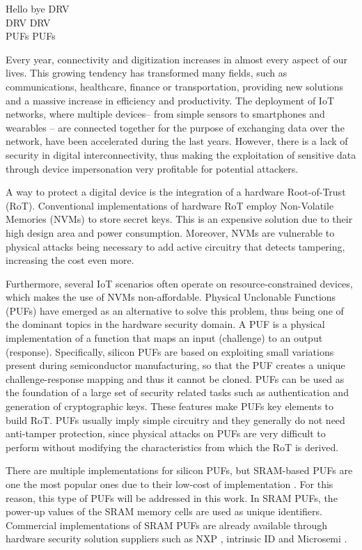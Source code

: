 Hello bye \gls{DRV} \\ \gls{DRV} \gls{DRV} \\
\glspl{PUF} \glspl{PUF}

Every year, connectivity and digitization increases in almost every aspect of our lives. This growing tendency has transformed many fields, such as communications, healthcare, finance or transportation, providing new solutions and a massive increase in efficiency and productivity. The deployment of IoT networks, where multiple devices– from simple sensors to smartphones and wearables – are connected together for the purpose of exchanging data over the network, have been accelerated during the last years. However, there is a lack of security in digital interconnectivity, thus making the exploitation of sensitive data through device impersonation very profitable for potential attackers. 

A way to protect a digital device is the integration of a hardware Root-of-Trust (RoT). Conventional implementations of hardware RoT employ Non-Volatile Memories (NVMs) to store secret keys. This is an expensive solution due to their high design area and power consumption. Moreover, NVMs are vulnerable to physical attacks being necessary to add active circuitry that detects tampering, increasing the cost even more. 

Furthermore, several IoT scenarios often operate on resource-constrained devices, which makes the use of NVMs non-affordable. Physical Unclonable Functions (PUFs) have emerged as an alternative to solve this problem, thus being one of the dominant topics in the hardware security domain. A PUF is a physical implementation of a function that maps an input (challenge) to an output (response). Specifically, silicon PUFs are based on exploiting small variations present during semiconductor manufacturing, so that the PUF creates a unique challenge-response mapping and thus it cannot be cloned. PUFs can be used as the foundation of a large set of security related tasks such as authentication and generation of cryptographic keys. These features make PUFs key elements to build RoT. PUFs usually imply simple circuitry and they generally do not need anti-tamper protection, since physical attacks on PUFs are very difficult to perform without modifying the characteristics from which the RoT is derived. 

There are multiple implementations for silicon PUFs, but SRAM-based PUFs are one the most popular ones due to their low-cost of implementation \cite{McGrath2019,Bohm2013}. For this reason, this type of PUFs will be addressed in this work. In SRAM PUFs, the power-up values of the SRAM memory cells are used as unique identifiers. Commercial implementations of SRAM PUFs are already available through hardware security solution suppliers such as NXP \cite{NXP}, intrinsic ID \cite{Intrinsic} and Microsemi \cite{Microsemi}.

